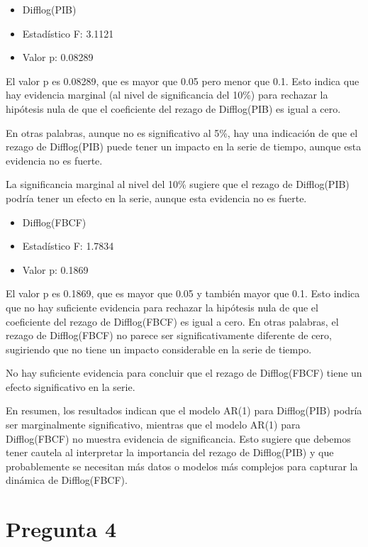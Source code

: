\documentclass[
  12pt,
]{article}
\providecommand{\tightlist}{%
  \setlength{\itemsep}{0pt}\setlength{\parskip}{0pt}}
\begin{document}
\begin{itemize}
\tightlist
\item
  Difflog(PIB)
\item
  Estadístico F: 3.1121
\item
  Valor p: 0.08289
\end{itemize}

El valor p es 0.08289, que es mayor que 0.05 pero menor que 0.1. Esto
indica que hay evidencia marginal (al nivel de significancia del 10\%)
para rechazar la hipótesis nula de que el coeficiente del rezago de
Difflog(PIB) es igual a cero.

En otras palabras, aunque no es significativo al 5\%, hay una indicación
de que el rezago de Difflog(PIB) puede tener un impacto en la serie de
tiempo, aunque esta evidencia no es fuerte.

La significancia marginal al nivel del 10\% sugiere que el rezago de
Difflog(PIB) podría tener un efecto en la serie, aunque esta evidencia
no es fuerte.

\begin{itemize}
\tightlist
\item
  Difflog(FBCF)
\item
  Estadístico F: 1.7834
\item
  Valor p: 0.1869
\end{itemize}

El valor p es 0.1869, que es mayor que 0.05 y también mayor que 0.1.
Esto indica que no hay suficiente evidencia para rechazar la hipótesis
nula de que el coeficiente del rezago de Difflog(FBCF) es igual a cero.
En otras palabras, el rezago de Difflog(FBCF) no parece ser
significativamente diferente de cero, sugiriendo que no tiene un impacto
considerable en la serie de tiempo.

No hay suficiente evidencia para concluir que el rezago de Difflog(FBCF)
tiene un efecto significativo en la serie.

En resumen, los resultados indican que el modelo AR(1) para Difflog(PIB)
podría ser marginalmente significativo, mientras que el modelo AR(1)
para Difflog(FBCF) no muestra evidencia de significancia. Esto sugiere
que debemos tener cautela al interpretar la importancia del rezago de
Difflog(PIB) y que probablemente se necesitan más datos o modelos más
complejos para capturar la dinámica de Difflog(FBCF).

\section{Pregunta 4}\label{pregunta-4}
\end{document}
